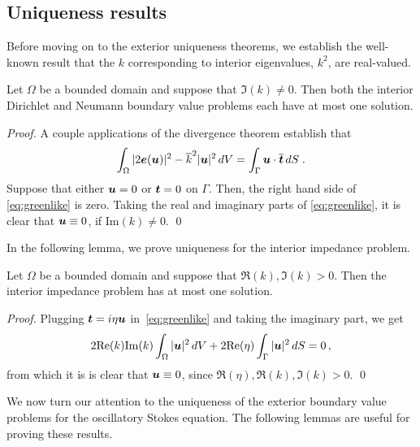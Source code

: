 \subsection{Uniqueness results}

Before moving on to the exterior uniqueness theorems,
we establish the well-known result that
the $k$ corresponding to interior eigenvalues, $k^2$,
are real-valued.

\begin{theorem}
  Let $\Omega$ be a bounded domain and suppose that
  $\Im (k) \neq 0$. Then both the interior
  Dirichlet and Neumann boundary value problems each
  have {\color{red} at most one solution}.
\end{theorem}
\begin{proof}
  A couple applications of the divergence theorem establish
  that
  \begin{equation} \label{eq:greenlike}
    \int_\Omega |2{\boldsymbol e}({\boldsymbol u})|^2 - \overline{k}^2 |{\boldsymbol u}|^2 \, dV
    = \int_\Gamma {\boldsymbol u} \cdot \overline{{\boldsymbol t}} \, dS \; . 
  \end{equation}
  Suppose that either ${\boldsymbol u} = 0$ or ${\boldsymbol t} = 0$ on $\Gamma$.
  Then, the right hand side of \cref{eq:greenlike} is
  zero. 
  Taking the real and imaginary parts of \cref{eq:greenlike},
  it is clear that ${\boldsymbol u} \equiv 0$, if $\text{Im}(k) \neq 0$.
\qed
\end{proof}

In the following lemma, we prove uniqueness for the
interior impedance problem.

\begin{theorem}
  Let $\Omega$ be a bounded domain and suppose that
  $\Re (k),\Im (k) > 0$. Then the interior
  impedance problem has {\color{red} at most one}
  solution.
\end{theorem}
\begin{proof}
  Plugging ${\boldsymbol t} = i\eta {\boldsymbol u}$ in~\cref{eq:greenlike}
  and taking the imaginary part, we get
  \begin{equation}
   2 {\rm Re}{(k)} {\textrm{\textup{Im}}}{(k)} \int_{\Omega} |{\boldsymbol u}|^2\, dV + 2{\rm Re}{(\eta)} \int_{\Gamma}
   |{\boldsymbol u}|^2 \, dS = 0 \, ,
  \end{equation}
  from which it is is clear that ${\boldsymbol u} \equiv 0$, since
  $\Re{(\eta)}, \Re{(k)}, \Im{(k)} > 0$.
\qed
\end{proof}

We now turn our attention to the uniqueness
of the exterior boundary value problems
for the oscillatory Stokes equation. The
following lemmas are useful for proving these results.


